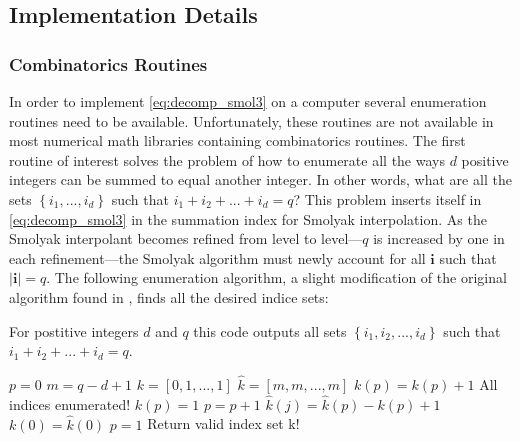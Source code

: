 \subsection{Implementation Details} \label{subsec:implement_details}

\subsubsection{Combinatorics Routines} \label{subsubsec:combinatorics_routines}

In order to implement \ref{eq:decomp_smol3} on a computer several enumeration routines need to be available. Unfortunately, these routines are not available in most numerical math libraries containing combinatorics routines. The first routine of interest solves the problem of how to enumerate all the ways $d$ positive integers can be summed to equal another integer. In other words, what are all the sets $\left\{i_1,...,i_d\right\}$ such that $i_1 + i_2 + ... + i_d = q$? This problem inserts itself in \ref{eq:decomp_smol3} in the summation index for Smolyak interpolation. As the Smolyak interpolant becomes refined from level to level---$q$ is increased by one in each refinement---the Smolyak algorithm must newly account for all $\textbf{i}$ such that $\vert\textbf{i}\vert=q$. The following enumeration algorithm, a slight modification of the original algorithm found in \cite{Holtz}, finds all the desired indice sets:        
\begin{algorithm}
\caption{\label{code:enumeration1} 
For postitive integers $d$ and $q$ this code outputs all sets $\left\{i_1,i_2,...,i_d\right\}$ such that $i_1+i_2+...+i_d=q$.} 
\begin{algorithmic}[1]
\State $p = 0$
\State $m = q - d + 1$ 
\State $k = \left[0,1,...,1\right]$   
\State $\hat{k} = \left[m,m,...,m\right]$  
\Repeat 
   \State $k(p) = k(p) + 1$
         \State All indices enumerated!
      \Else
         \State $k(p) = 1$
         \State $p = p + 1$ 
      \EndIf
   \Else
         \State $\hat{k}(j) = \hat{k}(p) - k(p) + 1$
      \EndFor
      \State $k(0) = \hat{k}(0)$
      \State $p = 1$
      \State Return valid index set k!
   \EndIf
{}
\end{algorithmic}
\end{algorithm}

